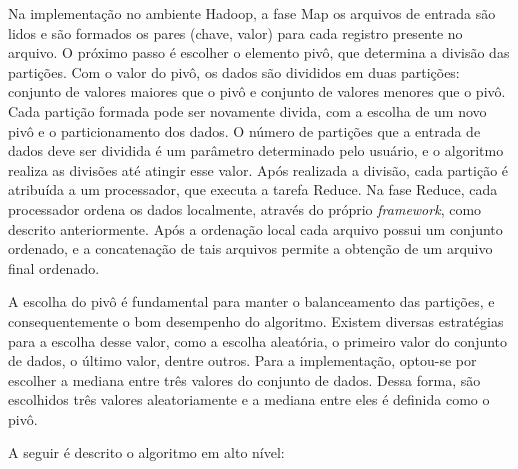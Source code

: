 Na implementação no ambiente Hadoop, a fase Map os arquivos de entrada são lidos e são formados os pares (chave, valor) para cada registro presente no arquivo. O próximo passo é escolher o elemento pivô, que determina a divisão das partições. Com o valor do pivô, os dados são divididos em duas partições: conjunto de valores maiores que o pivô e conjunto de valores menores que o pivô. 
Cada partição formada pode ser novamente divida, com a escolha de um novo pivô e o particionamento dos dados. O número de partições que a entrada de dados deve ser dividida é um parâmetro determinado pelo usuário, e o algoritmo realiza as divisões até atingir esse valor. Após realizada a divisão, cada partição é atribuída a um processador, que executa a tarefa Reduce. 
Na fase Reduce, cada processador ordena os dados localmente, através do próprio \textit{framework}, como descrito anteriormente. 
Após a ordenação local cada arquivo possui um conjunto ordenado, e a concatenação de tais arquivos permite a obtenção de um arquivo final ordenado.

A escolha do pivô é fundamental para manter o balanceamento das partições, e consequentemente o bom desempenho do algoritmo. Existem diversas estratégias para a escolha desse valor, como a escolha aleatória, o primeiro valor do conjunto de dados, o último valor, dentre outros. Para a implementação, optou-se por escolher a mediana entre três valores do conjunto de dados. Dessa forma, são escolhidos três valores aleatoriamente e a mediana entre eles é definida como o pivô.

A seguir é descrito o algoritmo em alto nível:

